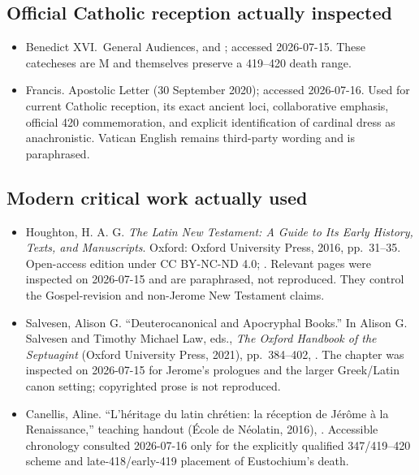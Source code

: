 \subsection{Official Catholic reception actually inspected}

\begin{itemize}
\item Benedict XVI.\ General Audiences,
 and
; accessed 2026-07-15. These catecheses are M and themselves preserve a
419--420 death range.
\item Francis. Apostolic Letter
 (30 September 2020); accessed 2026-07-16. Used for current
Catholic reception, its exact ancient loci, collaborative emphasis, official
420 commemoration, and explicit identification of cardinal dress as
anachronistic. Vatican English remains third-party wording and is paraphrased.
\end{itemize}

\subsection{Modern critical work actually used}

\begin{itemize}
\item Houghton, H. A. G. \emph{The Latin New Testament: A Guide to Its Early
History, Texts, and Manuscripts}. Oxford: Oxford University Press, 2016,
pp.~31--35. Open-access edition under CC BY-NC-ND 4.0;
.
Relevant pages were inspected on 2026-07-15 and are paraphrased, not reproduced.
They control the Gospel-revision and non-Jerome New Testament claims.
\item Salvesen, Alison G. ``Deuterocanonical and Apocryphal Books.'' In Alison
G. Salvesen and Timothy Michael Law, eds., \emph{The Oxford Handbook of the
Septuagint} (Oxford University Press, 2021), pp.~384--402,
.
The chapter was inspected on 2026-07-15 for Jerome's prologues and the larger
Greek/Latin canon setting; copyrighted prose is not reproduced.
\item Canellis, Aline. ``L'h\'eritage du latin chr\'etien: la r\'eception de
J\'er\^ome \`a la Renaissance,'' teaching handout (\'Ecole de N\'eolatin,
2016),
.
Accessible chronology consulted 2026-07-16 only for the explicitly qualified
347/419--420 scheme and late-418/early-419 placement of Eustochium's death.
\end{itemize}

\endgroup
